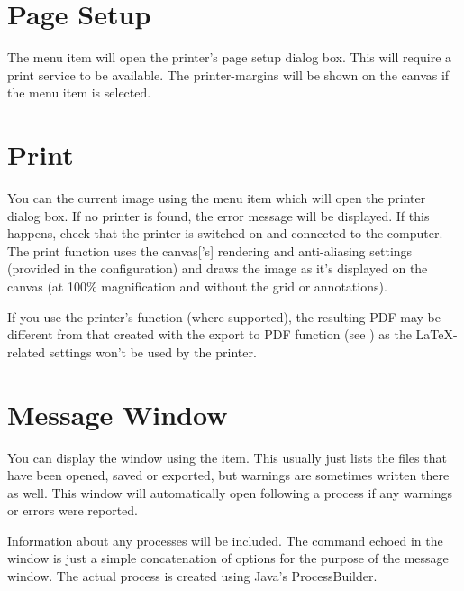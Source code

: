 \section{Page Setup}\label{sec:pagesetup}


The  menu item will open the printer's page
setup dialog box. This will require a print service to be available.
The \glspl{printer-margin} will be shown on the \gls{canvas} if the
 menu item is selected.

\section{Print}\label{sec:print}


You can  the current image using the  menu
item which will open the printer dialog box. If no printer is found,
the error message  will
be displayed. If this happens, check that the printer is switched
on and connected to the computer. The print function uses the
\gls{canvas}['s] \gls{rendering} and \gls{anti-aliasing} settings
(provided in the  configuration) and draws
the image as it's displayed on the \gls{canvas} (at 100\%
magnification and without the grid or annotations).

\begin{information}
If you use the printer's  function (where
supported), the resulting PDF may be different from that created
with the export to PDF function (see )
as the \LaTeX-related settings won't be used by the printer.
\end{information}

\section{Message Window}\label{sec:messages}


You can display the  window using the
 item. This usually just lists the files that
have been opened, saved or exported, but warnings are sometimes
written there as well. This window will automatically open following a process
if any warnings or errors were reported.

Information about any processes will be included. The command echoed
in the window is just a simple concatenation of options for the
purpose of the message window. The actual process is created using
Java's ProcessBuilder.

